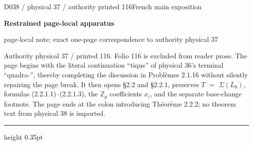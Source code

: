 \documentclass[9pt]{article}
\newcommand{\CanonText}[1]{\par{\fontsize{8.0}{9.35}\selectfont\RaggedRight #1\par}\vspace{2.2pt}}
\newcommand{\LayerTitle}{Restrained page-local apparatus}
\begin{document}
\noindent\begin{minipage}[t][\dimexpr\textheight-5pt\relax][t]{\textwidth}
{\sffamily\fontsize{7.3}{8.2}\selectfont\color{Quiet} D038 / physical 37 / authority printed 116\hfill French main exposition}
\par{}\vspace{4.5pt}
{\sffamily\fontsize{10.4}{11.6}\selectfont\bfseries\color{Accent} \LayerTitle}
\par{\sffamily\fontsize{6.7}{7.7}\selectfont\color{Quiet} page-local note; exact one-page correspondence to authority physical 37}
\vspace{5pt}
\CanonText{Authority physical 37 / printed 116. Folio 116 is excluded from reader prose. The page begins with the literal continuation “tique” of physical 36's terminal “quadra-”, thereby completing the discussion in Problèmes 2.1.16 without silently repairing the page break. It then opens §2.2 and §2.2.1, preserves \(T\) \(=\) \(\Sigma{}(L_{0})\), formulas (2.2.1.1)–(2.2.1.3), the \(\mathbb{Z}_{p}\) coefficients \(x_{i}\), and the separate base-change footnote. The page ends at the colon introducing Théorème 2.2.2; no theorem text from physical 38 is imported.}
\vfill
{\color{Accent}\hrule height 0.35pt}\vspace{3pt}
\end{minipage}
\newpage
\end{document}
